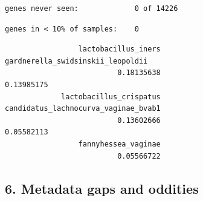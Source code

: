 \documentclass[
  letterpaper,
  DIV=11,
  numbers=noendperiod]{scrartcl}
\newenvironment{Shaded}{\begin{snugshade}}{\end{snugshade}}
\newcommand{\AttributeTok}[1]{\textcolor[rgb]{0.40,0.45,0.13}{#1}}
\newcommand{\CommentTok}[1]{\textcolor[rgb]{0.37,0.37,0.37}{#1}}
\newcommand{\ConstantTok}[1]{\textcolor[rgb]{0.56,0.35,0.01}{#1}}
\newcommand{\DecValTok}[1]{\textcolor[rgb]{0.68,0.00,0.00}{#1}}
\newcommand{\FloatTok}[1]{\textcolor[rgb]{0.68,0.00,0.00}{#1}}
\newcommand{\FunctionTok}[1]{\textcolor[rgb]{0.28,0.35,0.67}{#1}}
\newcommand{\NormalTok}[1]{\textcolor[rgb]{0.00,0.23,0.31}{#1}}
\newcommand{\OtherTok}[1]{\textcolor[rgb]{0.00,0.23,0.31}{#1}}
\newcommand{\SpecialCharTok}[1]{\textcolor[rgb]{0.37,0.37,0.37}{#1}}
\newcommand{\StringTok}[1]{\textcolor[rgb]{0.13,0.47,0.30}{#1}}
\begin{document}
\begin{verbatim}
genes never seen:             0 of 14226 
\end{verbatim}

\begin{Shaded}
\end{Shaded}

\begin{verbatim}
genes in < 10% of samples:    0 
\end{verbatim}

\begin{Shaded}
\end{Shaded}

\begin{verbatim}
                 lactobacillus_iners    gardnerella_swidsinskii_leopoldii 
                          0.18135638                           0.13985175 
             lactobacillus_crispatus candidatus_lachnocurva_vaginae_bvab1 
                          0.13602666                           0.05582113 
                 fannyhessea_vaginae 
                          0.05566722 
\end{verbatim}

\subsection{6. Metadata gaps and
oddities}\label{metadata-gaps-and-oddities}
\end{document}
